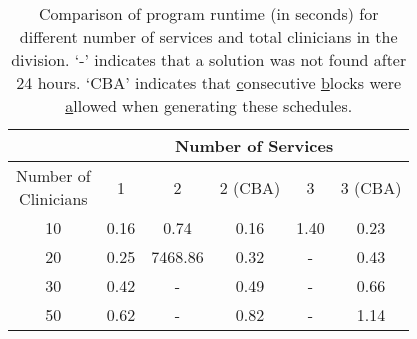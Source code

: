 \begin{table}[h]
	\centering
	\begin{tabular}{|c|c||c|c||c|c|}
		\hline
		                                      &  \multicolumn{5}{c|}{Number of Services}  \\ \hline
		\makecell[l]{Number of \\ Clinicians} &  1   &    2    & 2 (CBA) &  3   & 3 (CBA) \\ \hline
		                 10                   & 0.16 &  0.74   &  0.16   & 1.40 &  0.23   \\ \hline
		                 20                   & 0.25 & 7468.86 &  0.32   &  -   &  0.43   \\ \hline
		                 30                   & 0.42 &    -    &  0.49   &  -   &  0.66   \\ \hline
		                 50                   & 0.62 &    -    &  0.82   &  -   &  1.14   \\ \hline
	\end{tabular}
	\caption{Comparison of program runtime (in seconds) for different number of services and total clinicians in the division. `-' indicates that a solution was not found after 24 hours. `CBA' indicates that \underline{c}onsecutive \underline{b}locks were \underline{a}llowed when generating these schedules.}
	\label{tbl:runtime-services-clinicians-comparison}%
\end{table}